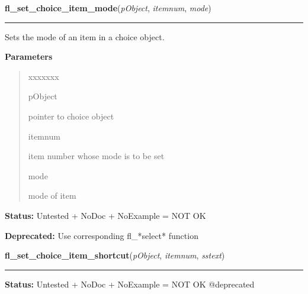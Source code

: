 \hspace{.8\funcindent}\begin{boxedminipage}{\funcwidth}

    \raggedright \textbf{fl\_set\_choice\_item\_mode}(\textit{pObject}, \textit{itemnum}, \textit{mode})

    \vspace{-1.5ex}

    \rule{\textwidth}{0.5\fboxrule}
\setlength{\parskip}{2ex}
    Sets the mode of an item in a choice object.

\setlength{\parskip}{1ex}
      \textbf{Parameters}
      \vspace{-1ex}

      \begin{quote}
        \begin{Ventry}{xxxxxxx}

          \item[pObject]

          pointer to choice object

          \item[itemnum]

          item number whose mode is to be set

          \item[mode]

          mode of item

        \end{Ventry}

      \end{quote}

\textbf{Status:} Untested + NoDoc + NoExample = NOT OK



\textbf{Deprecated:} Use corresponding fl\_*select* function



    \end{boxedminipage}

    \label{xformslib:library:fl_set_choice_item_shortcut}

    \vspace{0.5ex}

\hspace{.8\funcindent}\begin{boxedminipage}{\funcwidth}

    \raggedright \textbf{fl\_set\_choice\_item\_shortcut}(\textit{pObject}, \textit{itemnum}, \textit{sstext})

    \vspace{-1.5ex}

    \rule{\textwidth}{0.5\fboxrule}
\setlength{\parskip}{2ex}
\setlength{\parskip}{1ex}
\textbf{Status:} Untested + NoDoc + NoExample = NOT OK @deprecated



    \end{boxedminipage}

